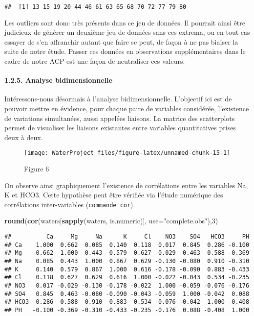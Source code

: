 \documentclass[]{article}
\newenvironment{Shaded}{\begin{snugshade}}{\end{snugshade}}
\newcommand{\KeywordTok}[1]{\textcolor[rgb]{0.13,0.29,0.53}{\textbf{#1}}}
\newcommand{\DataTypeTok}[1]{\textcolor[rgb]{0.13,0.29,0.53}{#1}}
\newcommand{\DecValTok}[1]{\textcolor[rgb]{0.00,0.00,0.81}{#1}}
\newcommand{\StringTok}[1]{\textcolor[rgb]{0.31,0.60,0.02}{#1}}
\newcommand{\NormalTok}[1]{#1}
\let\oldparagraph\paragraph
\renewcommand{\paragraph}[1]{\oldparagraph{#1}\mbox{}}
\begin{document}
\begin{verbatim}
##  [1] 13 15 19 20 44 46 61 63 65 68 70 72 77 79 80
\end{verbatim}

Les outliers sont donc très présents dans ce jeu de données. Il pourrait
ainsi être judicieux de générer un deuxième jeu de données sans ces
extrema, ou en tout cas essayer de s'en affranchir autant que faire se
peut, de façon à ne pas biaiser la suite de notre étude. Passer ces
données en observations supplémentaires dans le cadre de notre ACP est
une façon de neutraliser ces valeurs.

\hypertarget{analyse-bidimensionnelle}{\paragraph{1.2.5. Analyse
bidimensionnelle}\label{analyse-bidimensionnelle}}

Intéressons-nous désormais à l'analyse bidimensionnelle. L'objectif ici
est de pouvoir mettre en évidence, pour chaque paire de variables
considérée, l'existence de variations simultanées, aussi appelées
liaisons. La matrice des scatterplots permet de visualiser les liaisons
existantes entre variables quantitatives prises deux à deux.

\begin{figure}

{\centering \texttt{[image: WaterProject\_files/figure-latex/unnamed-chunk-15-1]} 

}

\caption{Figure 6}\label{fig:unnamed-chunk-15}
\end{figure}

On observe ainsi graphiquement l'existence de corrélations entre les
variables Na, K et HCO3. Cette hypothèse peut être vérifiée via l'étude
numérique des corrélations inter-variables (\texttt{commande\ cor}).

\begin{Shaded}
\begin{Highlighting}[]
\KeywordTok{round}\NormalTok{(}\KeywordTok{cor}\NormalTok{(waters[}\KeywordTok{sapply}\NormalTok{(waters, is.numeric)], }\DataTypeTok{use=}\StringTok{"complete.obs"}\NormalTok{),}\DecValTok{3}\NormalTok{)}
\end{Highlighting}
\end{Shaded}

\begin{verbatim}
##          Ca     Mg     Na      K     Cl    NO3    SO4   HCO3     PH
## Ca    1.000  0.662  0.085  0.140  0.118  0.017  0.845  0.286 -0.100
## Mg    0.662  1.000  0.443  0.579  0.627 -0.029  0.463  0.588 -0.369
## Na    0.085  0.443  1.000  0.867  0.629 -0.130 -0.080  0.910 -0.310
## K     0.140  0.579  0.867  1.000  0.616 -0.178 -0.090  0.883 -0.433
## Cl    0.118  0.627  0.629  0.616  1.000 -0.022 -0.043  0.534 -0.235
## NO3   0.017 -0.029 -0.130 -0.178 -0.022  1.000 -0.059 -0.076 -0.176
## SO4   0.845  0.463 -0.080 -0.090 -0.043 -0.059  1.000 -0.042  0.088
## HCO3  0.286  0.588  0.910  0.883  0.534 -0.076 -0.042  1.000 -0.408
## PH   -0.100 -0.369 -0.310 -0.433 -0.235 -0.176  0.088 -0.408  1.000
\end{verbatim}
\end{document}
